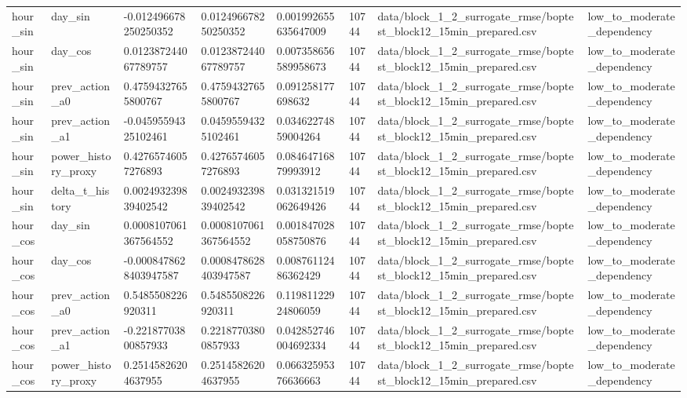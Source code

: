 \documentclass[11pt,a4paper]{article}
\begin{document}
\begin{small}
\begin{longtable}{L{2.06cm} L{2.06cm} L{2.06cm} L{2.06cm} L{2.06cm} L{2.06cm} L{2.06cm} L{2.06cm}}
hour\_sin & day\_sin & -0.012496678250250352 & 0.012496678250250352 & 0.001992655635647009 & 10744 & data/block\_1\_2\_surrogate\_rmse/boptest\_block12\_15min\_prepared.csv & low\_to\_moderate\_dependency \\
hour\_sin & day\_cos & 0.012387244067789757 & 0.012387244067789757 & 0.007358656589958673 & 10744 & data/block\_1\_2\_surrogate\_rmse/boptest\_block12\_15min\_prepared.csv & low\_to\_moderate\_dependency \\
hour\_sin & prev\_action\_a0 & 0.47594327655800767 & 0.47594327655800767 & 0.091258177698632 & 10744 & data/block\_1\_2\_surrogate\_rmse/boptest\_block12\_15min\_prepared.csv & low\_to\_moderate\_dependency \\
hour\_sin & prev\_action\_a1 & -0.04595594325102461 & 0.04595594325102461 & 0.03462274859004264 & 10744 & data/block\_1\_2\_surrogate\_rmse/boptest\_block12\_15min\_prepared.csv & low\_to\_moderate\_dependency \\
hour\_sin & power\_history\_proxy & 0.42765746057276893 & 0.42765746057276893 & 0.08464716879993912 & 10744 & data/block\_1\_2\_surrogate\_rmse/boptest\_block12\_15min\_prepared.csv & low\_to\_moderate\_dependency \\
hour\_sin & delta\_t\_history & 0.002493239839402542 & 0.002493239839402542 & 0.031321519062649426 & 10744 & data/block\_1\_2\_surrogate\_rmse/boptest\_block12\_15min\_prepared.csv & low\_to\_moderate\_dependency \\
hour\_cos & day\_sin & 0.0008107061367564552 & 0.0008107061367564552 & 0.001847028058750876 & 10744 & data/block\_1\_2\_surrogate\_rmse/boptest\_block12\_15min\_prepared.csv & low\_to\_moderate\_dependency \\
hour\_cos & day\_cos & -0.0008478628403947587 & 0.0008478628403947587 & 0.00876112486362429 & 10744 & data/block\_1\_2\_surrogate\_rmse/boptest\_block12\_15min\_prepared.csv & low\_to\_moderate\_dependency \\
hour\_cos & prev\_action\_a0 & 0.5485508226920311 & 0.5485508226920311 & 0.11981122924806059 & 10744 & data/block\_1\_2\_surrogate\_rmse/boptest\_block12\_15min\_prepared.csv & low\_to\_moderate\_dependency \\
hour\_cos & prev\_action\_a1 & -0.22187703800857933 & 0.22187703800857933 & 0.042852746004692334 & 10744 & data/block\_1\_2\_surrogate\_rmse/boptest\_block12\_15min\_prepared.csv & low\_to\_moderate\_dependency \\
hour\_cos & power\_history\_proxy & 0.25145826204637955 & 0.25145826204637955 & 0.06632595376636663 & 10744 & data/block\_1\_2\_surrogate\_rmse/boptest\_block12\_15min\_prepared.csv & low\_to\_moderate\_dependency \\

\end{longtable}
\end{small}
\end{document}
